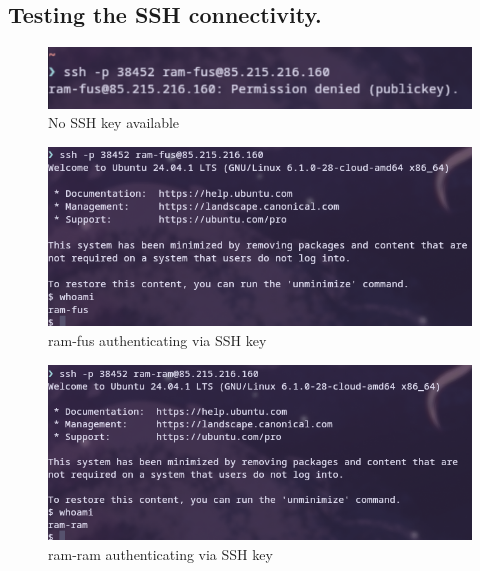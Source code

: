 \documentclass[a4paper]{article}
\begin{document}
\subsection {Testing the SSH connectivity.}
\begin{figure}[h]
	\includegraphics[scale=0.13]{images/nokey.png}
	\centering
	\caption{No SSH key available}
\end{figure}
\begin{figure}[!hbp]
	\includegraphics[scale=0.3]{images/yeskey.png}
	\centering
	\caption{ram-fus authenticating via SSH key}
\end{figure}

\begin{figure}[!htbp]
	\includegraphics[scale=0.3]{images/yeskey2.png}
	\centering
	\caption{ram-ram authenticating via SSH key}
\end{figure}\newpage
\end{document}
